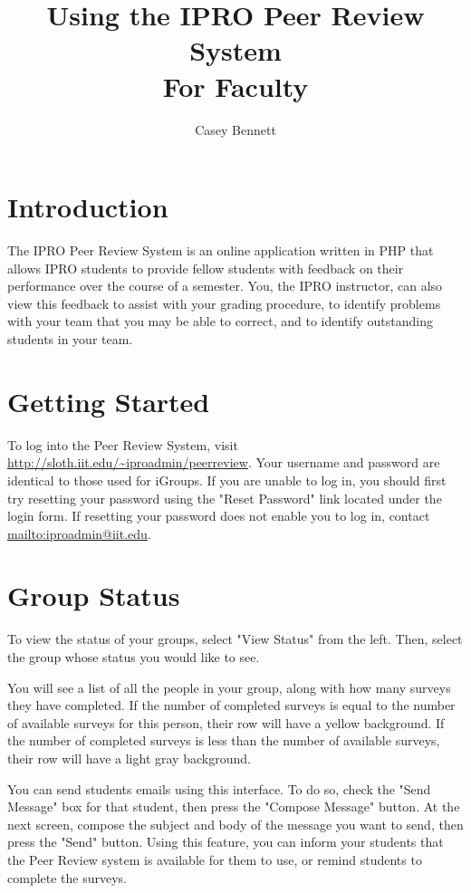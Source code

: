 \documentclass{article}
\title{Using the IPRO Peer Review System\\For Faculty}
\author{Casey Bennett}
\begin{document}
\maketitle
\tableofcontents
\newpage

\section{Introduction}

The IPRO Peer Review System is an online application written in PHP that allows IPRO students to provide fellow students with feedback on their performance over the course of a semester. You, the IPRO instructor, can also view this feedback to assist with your grading procedure, to identify problems with your team that you may be able to correct, and to identify outstanding students in your team.

\section{Getting Started}

To log into the Peer Review System, visit \url{http://sloth.iit.edu/~iproadmin/peerreview}. Your username and password are identical to those used for iGroups. If you are unable to log in, you should first try resetting your password using the "Reset Password" link located under the login form. If resetting your password does not enable you to log in, contact \url{mailto:iproadmin@iit.edu}.

\section{Group Status}

To view the status of your groups, select "View Status" from the left. Then, select the group whose status you would like to see.

You will see a list of all the people in your group, along with how many surveys they have completed. If the number of completed surveys is equal to the number of available surveys for this person, their row will have a yellow background. If the number of completed surveys is less than the number of available surveys, their row will have a light gray background.

You can send students emails using this interface. To do so, check the "Send Message" box for that student, then press the "Compose Message" button. At the next screen, compose the subject and body of the message you want to send, then press the "Send" button. Using this feature, you can inform your students that the Peer Review system is available for them to use, or remind students to complete the surveys.
\end{document}
